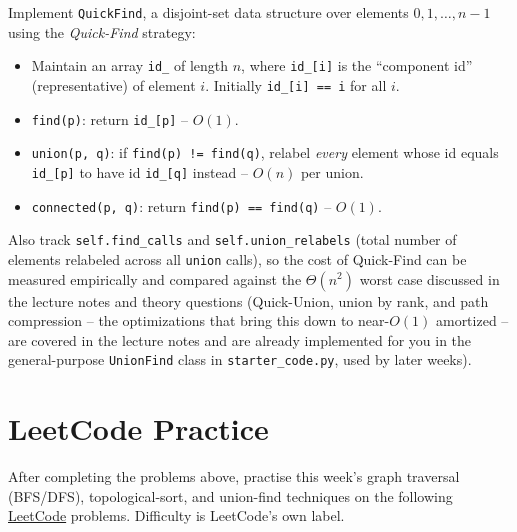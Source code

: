 \documentclass[11pt]{article}
\begin{document}
Implement \texttt{QuickFind}, a disjoint-set data structure over elements
$0,1,\dots,n-1$ using the \emph{Quick-Find} strategy:

\begin{itemize}
    \item Maintain an array \texttt{id\_} of length $n$, where \texttt{id\_[i]} is the
    ``component id'' (representative) of element $i$. Initially \texttt{id\_[i] == i}
    for all $i$.
    \item \texttt{find(p)}: return \texttt{id\_[p]} -- $O(1)$.
    \item \texttt{union(p, q)}: if \texttt{find(p) != find(q)}, relabel \emph{every}
    element whose id equals \texttt{id\_[p]} to have id \texttt{id\_[q]} instead --
    $O(n)$ per union.
    \item \texttt{connected(p, q)}: return \texttt{find(p) == find(q)} -- $O(1)$.
\end{itemize}

Also track \texttt{self.find\_calls} and \texttt{self.union\_relabels} (total number of
elements relabeled across all \texttt{union} calls), so the cost of Quick-Find can be
measured empirically and compared against the $\Theta(n^2)$ worst case discussed in the
lecture notes and theory questions (Quick-Union, union by rank, and path compression --
the optimizations that bring this down to near-$O(1)$ amortized -- are covered in the
lecture notes and are already implemented for you in the general-purpose
\texttt{UnionFind} class in \texttt{starter\_code.py}, used by later weeks).

\newpage
\section{LeetCode Practice}

After completing the problems above, practise this week's graph traversal (BFS/DFS),
topological-sort, and union-find techniques on the following
\href{https://leetcode.com}{LeetCode} problems. Difficulty is LeetCode's own label.
\end{document}
